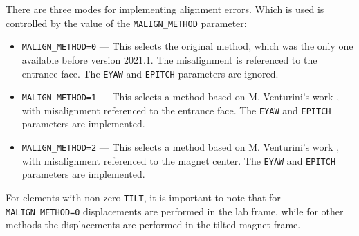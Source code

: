 There are three modes for implementing alignment errors. Which is used
is controlled by the value of the \verb|MALIGN_METHOD| parameter:
\begin{itemize}
\item \verb|MALIGN_METHOD=0| --- This selects the original method, which was
  the only one available before version 2021.1. The misalignment is
  referenced to the entrance face. The \verb|EYAW| and \verb|EPITCH| parameters
  are ignored. 
\item \verb|MALIGN_METHOD=1| --- This selects a method based on M. Venturini's
  work \cite{Venturini2021}, with misalignment referenced to the entrance face.
  The \verb|EYAW| and \verb|EPITCH| parameters are implemented.
\item \verb|MALIGN_METHOD=2| --- This selects a method based on M. Venturini's
  work \cite{Venturini2021}, with misalignment referenced to the magnet center.
  The \verb|EYAW| and \verb|EPITCH| parameters are implemented.
\end{itemize}

For elements with non-zero \verb|TILT|,  it is important to note that for \verb|MALIGN_METHOD=0|
displacements are performed in the lab frame, while for other methods the displacements are
performed in the tilted magnet frame.
